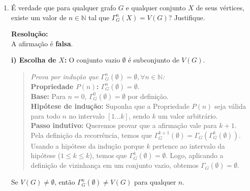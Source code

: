 \begin{enumerate}[label=\textbf{\arabic*.}, ref=\arabic*]
\begin{enumerate}
        \vspace{0.3cm}
        \noindent \textbf{Resolução:} \\
        Por definição, $\Gamma_{G}(X) = \bigcup_{v \in X} \Gamma_G(v)$. Aplicando a recorrência para o Grafo de Petersen (Exercício 8, esquerda):
        \begin{itemize}
            \item $\Gamma_{G}^{0}(\{a_{0},b_{2}\}) = \{a_{0},b_{2}\}$ (Caso base)
            \item $\Gamma_{G}^{1}(\{a_{0},b_{2}\}) = \{a_{1},a_{2},a_{4},b_{0}, b_{4}\}$
            \item $\Gamma_{G}^{2}(\{a_{0},b_{2}\}) = \{a_{0}, a_1, a_2, a_3, a_4, b_1, b_2, b_3, b_4\}$
            \item $\Gamma_{G}^{3}(\{a_{0},b_{2}\}) = V(G)$
            \item $\Gamma_{G}^{4}(\{a_{0},b_{2}\}) = V(G)$
            \item $\Gamma_{G}^{5}(\{a_{0},b_{2}\}) = V(G)$
        \end{itemize}
    
        \vspace{0.3cm}
        \item É verdade que para qualquer grafo $G$ e qualquer conjunto $X$ de seus vértices, existe um valor de $n\in\mathbb{N}$ tal que $\Gamma_{G}^{n}(X)=V(G)$? Justifique.
    
        \vspace{0.3cm}
        \noindent \textbf{Resolução:} \\
        A afirmação é \textbf{falsa}.
    
        \noindent \textbf{i) Escolha de $X$:} O conjunto vazio $\emptyset$ é subconjunto de $V(G)$. 
        \begin{quote}
            \textit{Prova por indução que $\Gamma_{G}^{n}(\emptyset) = \emptyset, \forall n \in \mathbb{N}$:} \\
            \textbf{Propriedade $P(n)$:} $\Gamma_{G}^{n}(\emptyset) = \emptyset$. \\
            \textbf{Base:} Para $n=0$, $\Gamma_{G}^{0}(\emptyset) = \emptyset$ por definição. \\
            \textbf{Hipótese de indução:} Suponha que a Propriedade $P(n)$ seja válida para todo $n$ no intervalo $[1 \dots k]$, sendo $k$ um valor arbitrário. \\
            \textbf{Passo indutivo:} Queremos provar que a afirmação vale para $k+1$. Pela definição da recorrência, temos que $\Gamma_{G}^{k+1}(\emptyset) = \Gamma_{G}(\Gamma_{G}^{k}(\emptyset))$. Usando a hipótese da indução porque $k$ pertence ao intervalo da hipótese ($1 \le k \le k$), temos que $\Gamma_{G}^{k}(\emptyset) = \emptyset$. Logo, aplicando a definição de vizinhança em um conjunto vazio, obtemos $\Gamma_{G}(\emptyset) = \emptyset$.
        \end{quote}
        Se $V(G) \neq \emptyset$, então $\Gamma_{G}^{n}(\emptyset) \neq V(G)$ para qualquer $n$.
    

\end{enumerate}
\end{enumerate}
